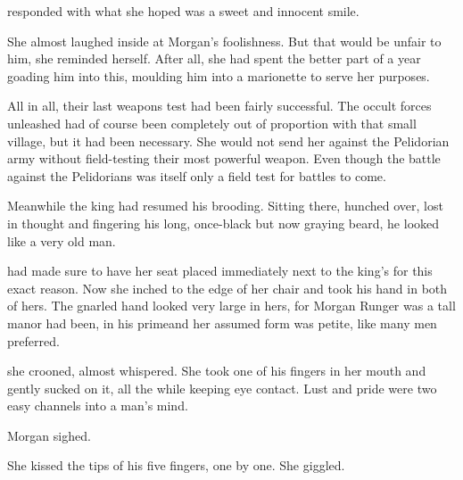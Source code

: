 \Takestsha{} responded with what she hoped was a sweet and innocent smile. 

She almost laughed inside at Morgan's foolishness. 
But that would be unfair to him, she reminded herself. 
After all, she had spent the better part of a year goading him into this, moulding him into a marionette to serve her purposes. 

All in all, their last weapons test had been fairly successful. 
The occult forces unleashed had of course been completely out of proportion with that small village, but it had been necessary. 
She would not send her \ishrah against the Pelidorian army without field-testing their most powerful weapon. 
Even though the battle against the Pelidorians was itself only a field test for battles to come. 

Meanwhile the king had resumed his brooding. 
Sitting there, hunched over, lost in thought and fingering his long, once-black but now graying beard, he looked like a very old man. 


\Takestsha{} had made sure to have her seat placed immediately next to the king's for this exact reason. 
Now she inched to the edge of her chair and took his hand in both of hers. 
The gnarled hand looked very large in hers, for Morgan Runger was a tall man\dash or had been, in his prime\dash and her assumed form was petite, like many men preferred. 

 she crooned, almost whispered. 
She took one of his fingers in her mouth and gently sucked on it, all the while keeping eye contact. 
Lust and pride were two easy channels into a man's mind. 

Morgan sighed. 

She kissed the tips of his five fingers, one by one. 
She giggled. 

